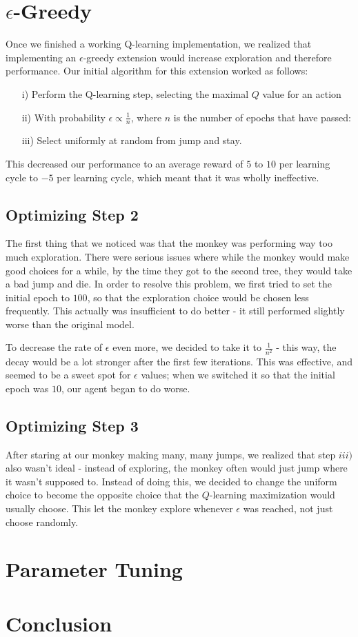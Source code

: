 \documentclass[10pt, oneside]{article}
\begin{document}
\section{$\epsilon$-Greedy}
Once we finished a working Q-learning implementation, we realized that implementing an $\epsilon$-greedy extension would increase exploration and therefore performance. Our initial algorithm for this extension worked as follows:
\begin{enumerate}
\item[i)] Perform the Q-learning step, selecting the maximal $Q$ value for an action
\item[ii)] With probability $\epsilon \propto \frac{1}{n}$, where $n$ is the number of epochs that have passed:
\item[iii)] Select uniformly at random from jump and stay.
\end{enumerate}
This decreased our performance to an average reward of $5$ to $10$ per learning cycle to $-5$ per learning cycle, which meant that it was wholly ineffective.

\subsection{Optimizing Step 2}
The first thing that we noticed was that the monkey was performing way too much exploration. There were serious issues where while the monkey would make good choices for a while, by the time they got to the second tree, they would take a bad jump and die. In order to resolve this problem, we first tried to set the initial epoch to $100$, so that the exploration choice would be chosen less frequently. This actually was insufficient to do better - it still performed slightly worse than the original model.

To decrease the rate of $\epsilon$ even more, we decided to take it to $\frac{1}{n^2}$ - this way, the decay would be a lot stronger after the first few iterations. This was effective, and seemed to be a sweet spot for $\epsilon$ values; when we switched it so that the initial epoch was $10$, our agent began to do worse.

\subsection{Optimizing Step 3}
After staring at our monkey making many, many jumps, we realized that step $iii)$ also wasn't ideal - instead of exploring, the monkey often would just jump where it wasn't supposed to. Instead of doing this, we decided to change the uniform choice to become the opposite choice that the $Q$-learning maximization would usually choose. This let the monkey explore whenever $\epsilon$ was reached, not just choose randomly. 

\section{Parameter Tuning}
\section{Conclusion} 
\end{document}
